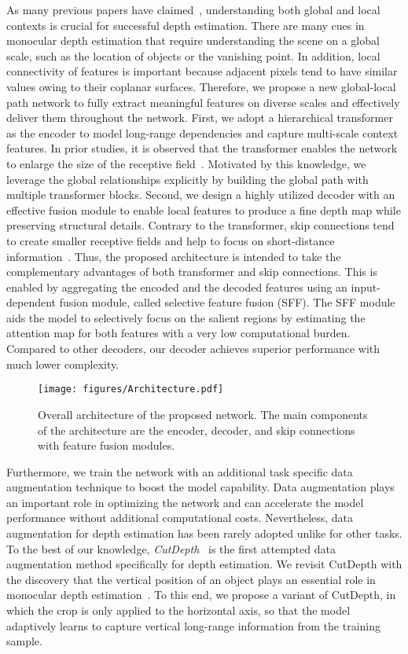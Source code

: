 \documentclass{article}
\makeatletter
\let\@internalcite\cite
\def\cite{\def\citeauthoryear##1##2{##1, ##2}\@internalcite}
\makeatother
\begin{document}
As many previous papers have claimed~\cite{chen2019structure,kim2020leveraging}, understanding both global and local contexts is crucial for successful depth estimation. There are many cues in monocular depth estimation that require understanding the scene on a global scale, such as the location of objects or the vanishing point. 
In addition, local connectivity of features is important because adjacent pixels tend to have similar values owing to their coplanar surfaces. Therefore, we propose a new global-local path network to fully extract meaningful features on diverse scales and effectively deliver them throughout the network.
First, we adopt a hierarchical transformer as the encoder to model long-range dependencies and capture multi-scale context features. 
In prior studies, it is observed that the transformer enables the network to enlarge the size of the receptive field~\cite{xie2021segformer}.
Motivated by this knowledge, we leverage the global relationships explicitly by building the global path with multiple transformer blocks.
Second, we design a highly utilized decoder with an effective fusion module to enable local features to produce a fine depth map while preserving structural details.
Contrary to the transformer, skip connections tend to create smaller receptive fields and help to focus on short-distance information~\cite{luo2016understanding}. 
Thus, the proposed architecture is intended to take the complementary advantages of both transformer and skip connections. This is enabled by aggregating the encoded and the decoded features using an input-dependent fusion module, called selective feature fusion (SFF).
The SFF module aids the model to selectively focus on the salient regions by estimating the attention map for both features with a very low computational burden.
Compared to other decoders, our decoder achieves superior performance with much lower complexity. 




\begin{figure*}[h]
\centering
{\texttt{[image: figures/Architecture.pdf]}}
\caption{Overall architecture of the proposed network. The main components of the architecture are the encoder, decoder, and skip connections with feature fusion modules.}
\label{fig:architecture}
\end{figure*}

Furthermore, we train the network with an additional task specific data augmentation technique to boost the model capability. 
Data augmentation plays an important role in optimizing the network and can accelerate the model performance without additional computational costs. Nevertheless, data augmentation for depth estimation has been rarely adopted unlike for other tasks. 
To the best of our knowledge, \textit{CutDepth}~\cite{ishii2021cutdepth} is the first attempted data augmentation method specifically for depth estimation. We revisit CutDepth with the discovery that the vertical position of an object plays an essential role in monocular depth estimation~\cite{dijk2019neural}.
To this end, we propose a variant of CutDepth, in which the crop is only applied to the horizontal axis, so that the model adaptively learns to capture vertical long-range information from the training sample.
\end{document}
